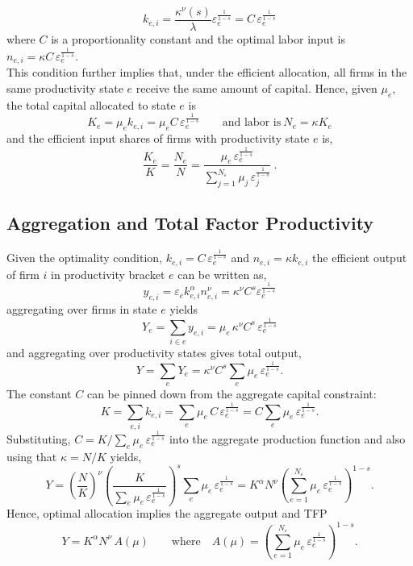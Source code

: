 \documentclass[12pt]{article}
\begin{document}
$$ k_{e,i} = \frac{\kappa^{\nu} (s)}{\lambda} \varepsilon_e^{\frac{1}{1-s}} =  C\,\varepsilon_e^{\frac{1}{1-s}} $$ 
where $C$ is a proportionality constant and the optimal labor input is $n_{e,i}=\kappa C\,\varepsilon_e^{\frac{1}{1-s}}$.\vspace{3mm} \\
This condition further implies that, under the efficient allocation, all firms in the same productivity state $e$ receive the same amount of capital. Hence, given $\mu_e$, the total capital allocated to state $e$ is
$$K_e=\mu_e k_{e,i}=\mu_e C\,\varepsilon_e^{\frac{1}{1-s}} \qquad \text{and labor is} \ N_e=\kappa K_e$$  
and the efficient input shares of firms with productivity state $e$ is,
$$  \frac{K_e}{K}=\frac{N_e}{N} =\frac{\mu_e\,\varepsilon_e^{\frac{1}{1-s}}}{\sum_{j=1}^{N_\varepsilon}\mu_j\,\varepsilon_j^{\frac{1}{1-s}}}\ . $$

\subsection{Aggregation and Total Factor Productivity \label{sec: aggregation}} 
Given the optimality condition, $ k_{e,i} = C\,\varepsilon_e^{\frac{1}{1-s}}$ and $n_{e,i}=\kappa k_{e,i}$ the efficient output of firm $i$ in productivity bracket $e$ can be written as, 
$$ y_{e,i} = \varepsilon_e k_{e,i}^{\alpha} n_{e,i}^{\nu}  = \kappa^\nu C^s \varepsilon_{e}^{\frac{1}{1-s}} $$
aggregating over firms in state $e$ yields 
$$ Y_e = \sum_{i\in e} y_{e,i}  = \mu_e \,\kappa^{\nu} C^{s}\,\varepsilon_e^{\tfrac{1}{1-s}} $$ 
and aggregating over productivity states gives total output,
$$ Y = \sum_e Y_e = \kappa^{\nu} C^{s}\sum_e \mu_e\,\varepsilon_e^{\tfrac{1}{1-s}}. $$
The constant $C$ can be pinned down from the aggregate capital constraint:
$$ K = \sum_{e,i} k_{e,i} = \sum_e \mu_e\,C\,\varepsilon_e^{\tfrac{1}{1-s}} = C \sum_e \mu_e\,\varepsilon_e^{\tfrac{1}{1-s}}. $$
Substituting, $C = K / \sum_e \mu_e\,\varepsilon_e^{\frac{1}{1-s}}$ into the aggregate production function and also using that $\kappa = N/K$ yields,
$$
Y
= \left(\frac{N}{K}\right)^{\nu} \left(\frac{K}{\sum_e \mu_e\,\varepsilon_e^{\tfrac{1}{1-s}}}\right)^{s} \sum_e \mu_e\,\varepsilon_e^{\tfrac{1}{1-s}} = 
K^{\alpha}N^{\nu}\left(\sum_{e=1}^{N_\varepsilon}\mu_e\,\varepsilon_e^{\tfrac{1}{1-s}}\right)^{1-s}. $$
Hence, optimal allocation implies the aggregate output and TFP
$$ Y = K^{\alpha}N^{\nu}\,A(\mu) \qquad \text{where} \quad A(\mu)=\left(\sum_{e=1}^{N_\varepsilon}\mu_e\,\varepsilon_e^{\frac{1}{1-s}}\right)^{1-s} . $$
\end{document}
